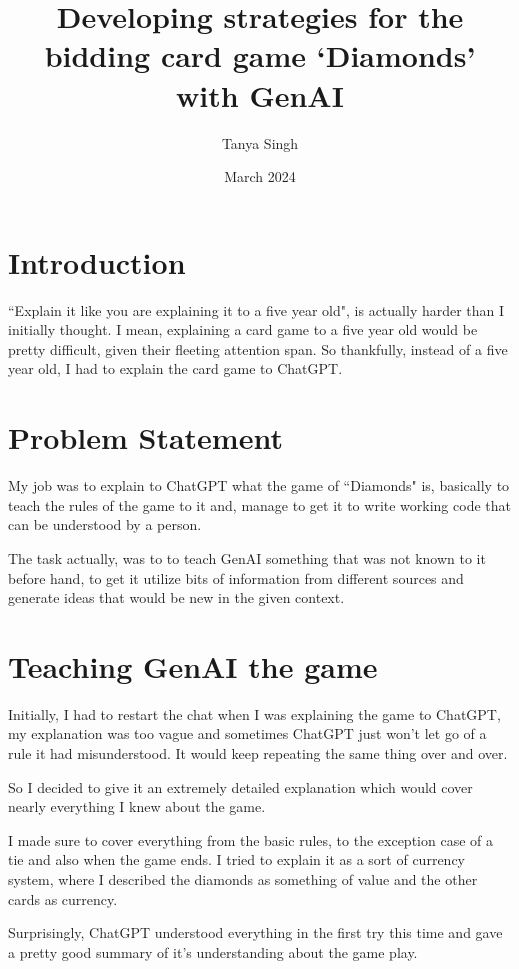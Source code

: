 \documentclass{article}
\title{Developing strategies for the bidding card game `Diamonds' with GenAI}
\author{Tanya Singh}
\date{March 2024}
\begin{document}
\maketitle

\section{Introduction}
``Explain it like you are explaining it to a five year old", is actually harder than I initially thought. I mean, explaining a card game to a five year old would be pretty difficult, given their fleeting attention span. So thankfully, instead of a five year old, I had to explain the card game to ChatGPT.

\section{Problem Statement}
My job was to explain to ChatGPT what the game of ``Diamonds" is, basically to teach the rules of the game to it and, manage to get it to write working code that can be understood by a person. \newline

The task actually, was to to teach GenAI something that was not known to it before hand, to get it utilize bits of information from different sources and generate ideas that would be new in the given context. 

\section{Teaching GenAI the game}
Initially, I had to restart the chat when I was explaining the game to ChatGPT, my explanation was too vague and sometimes ChatGPT just won't let go of a rule it had misunderstood. It would keep repeating the same thing over and over. \newline

So I decided to give it an extremely detailed explanation which would cover nearly everything I knew about the game.\newline

I made sure to cover everything from the basic rules, to the exception case of a tie and also when the game ends. I tried to explain it as a sort of currency system, where I described the diamonds as something of value and the other cards as currency. \newline

Surprisingly, ChatGPT understood everything in the first try this time and gave a pretty good summary of it's understanding about the game play.\newline
\end{document}
